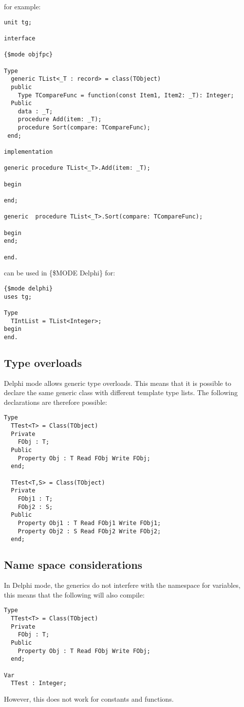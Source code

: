 for example:
\begin{verbatim}
unit tg;

interface

{$mode objfpc}

Type
  generic TList<_T : record> = class(TObject)
  public
    Type TCompareFunc = function(const Item1, Item2: _T): Integer;
  Public
    data : _T;
    procedure Add(item: _T);
    procedure Sort(compare: TCompareFunc);
 end;

implementation

generic procedure TList<_T>.Add(item: _T);

begin

end;

generic  procedure TList<_T>.Sort(compare: TCompareFunc);

begin
end;

end. 
\end{verbatim}
can be used in \{\$MODE Delphi\} for:
\begin{verbatim}
{$mode delphi}
uses tg;

Type
  TIntList = TList<Integer>;
begin
end.
\end{verbatim}


\subsection{Type overloads}
Delphi mode allows generic type overloads. This means that it is possible to declare the same generic class
with different template type lists. The following declarations are therefore possible:
\begin{verbatim}
Type
  TTest<T> = Class(TObject)
  Private
    FObj : T;
  Public
    Property Obj : T Read FObj Write FObj;
  end;

  TTest<T,S> = Class(TObject)
  Private
    FObj1 : T;
    FObj2 : S;
  Public
    Property Obj1 : T Read FObj1 Write FObj1;
    Property Obj2 : S Read FObj2 Write FObj2;
  end;
\end{verbatim}

\subsection{Name space considerations}
In Delphi mode, the generics do not interfere with the namespace for variables, this means that the following will also compile:
\begin{verbatim}
Type
  TTest<T> = Class(TObject)
  Private
    FObj : T;
  Public
    Property Obj : T Read FObj Write FObj;
  end;

Var
  TTest : Integer;
\end{verbatim}
However, this does not work for constants and functions.

